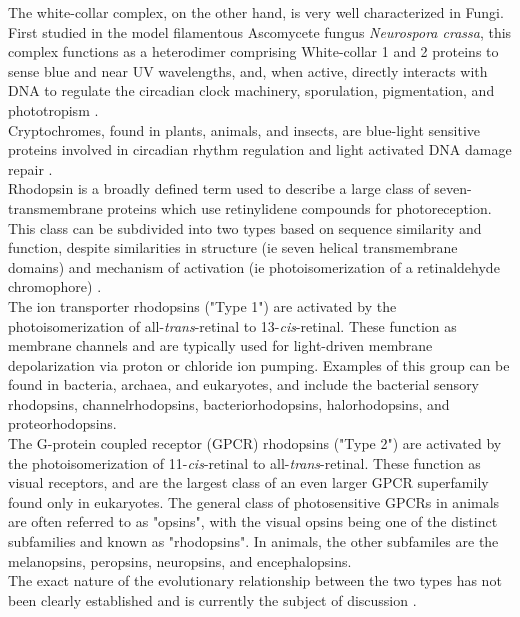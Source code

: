 \indent The white-collar complex, on the other hand, is very well characterized in Fungi. First studied in the model filamentous Ascomycete fungus \textit{Neurospora crassa}, this complex functions as a heterodimer comprising White-collar 1 and 2 proteins to sense blue and near UV wavelengths, and, when active, directly interacts with DNA to regulate the circadian clock machinery, sporulation, pigmentation, and phototropism \cite{Ballario1997,Purschwitz2006,Corrochano2007}. \\
\indent Cryptochromes, found in plants, animals, and insects, are blue-light sensitive proteins involved in circadian rhythm regulation and light activated DNA damage repair \cite{Idnurm2010}.\\
\indent Rhodopsin is a broadly defined term used to describe a large class of seven-transmembrane proteins which use retinylidene compounds for photoreception. This class can be subdivided into two types based on sequence similarity and function, despite similarities in structure (ie seven helical transmembrane domains) and mechanism of activation (ie photoisomerization of a retinaldehyde chromophore) \cite{Spudich2000}.\\
\indent The ion transporter rhodopsins ("Type 1") are activated by the photoisomerization of all-\textit{trans}-retinal to 13-\textit{cis}-retinal. These function as membrane channels and are typically used for light-driven membrane depolarization via proton or chloride ion pumping. Examples of this group can be found in bacteria, archaea, and eukaryotes, and include the bacterial sensory rhodopsins, channelrhodopsins, bacteriorhodopsins, halorhodopsins, and proteorhodopsins.\\
\indent The G-protein coupled receptor (GPCR) rhodopsins ("Type 2") are activated by the photoisomerization of 11-\textit{cis}-retinal to all-\textit{trans}-retinal. These function as visual receptors, and are the largest class of an even larger GPCR superfamily found only in eukaryotes. The general class of photosensitive GPCRs in animals are often referred to as "opsins", with the visual opsins being one of the distinct subfamilies and known as "rhodopsins". In animals, the other subfamiles are the melanopsins, peropsins, neuropsins, and encephalopsins.\\
\indent The exact nature of the evolutionary relationship between the two types has not been clearly established and is currently the subject of discussion \cite{Terakita2005,Shichida2009}.\\
